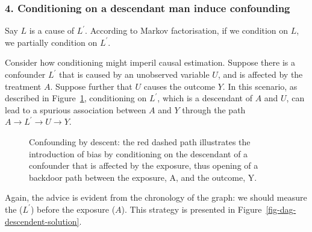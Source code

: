 \documentclass[
  singlecolumn]{article}
\begin{document}
\subsubsection{4. Conditioning on a descendant man induce
confounding}\label{conditioning-on-a-descendant-man-induce-confounding}

Say \(L\) is a cause of \(L^\prime\). According to Markov factorisation,
if we condition on \(L\), we partially condition on \(L^\prime\).

Consider how conditioning might imperil causal estimation. Suppose there
is a confounder \(L^\prime\) that is caused by an unobserved variable
\(U\), and is affected by the treatment \(A\). Suppose further that
\(U\) causes the outcome \(Y\). In this scenario, as described in
Figure~\ref{fig-dag-descendent}, conditioning on \(L^\prime\), which is
a descendant of \(A\) and \(U\), can lead to a spurious association
between \(A\) and \(Y\) through the path \(A \to L^\prime \to U \to Y\).

\begin{figure}


\caption{\label{fig-dag-descendent}Confounding by descent: the red
dashed path illustrates the introduction of bias by conditioning on the
descendant of a confounder that is affected by the exposure, thus
opening of a backdoor path between the exposure, A, and the outcome, Y.}

\end{figure}%

Again, the advice is evident from the chronology of the graph: we should
measure the (\(L^\prime\)) before the exposure (\(A\)). This strategy is
presented in Figure~\ref{fig-dag-descendent-solution}.
\end{document}
